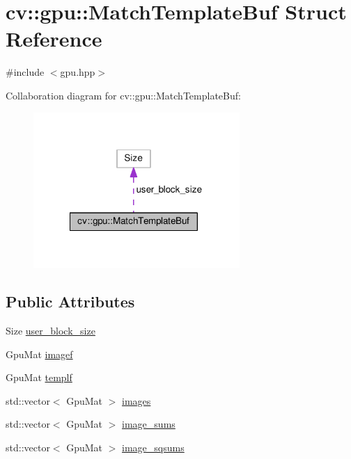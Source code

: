 \hypertarget{structcv_1_1gpu_1_1MatchTemplateBuf}{\section{cv\-:\-:gpu\-:\-:Match\-Template\-Buf Struct Reference}
\label{structcv_1_1gpu_1_1MatchTemplateBuf}
}


{\ttfamily \#include $<$gpu.\-hpp$>$}



Collaboration diagram for cv\-:\-:gpu\-:\-:Match\-Template\-Buf\-:\nopagebreak
\begin{figure}[H]
\begin{center}
\leavevmode
\includegraphics[width=222pt]{structcv_1_1gpu_1_1MatchTemplateBuf__coll__graph}
\end{center}
\end{figure}
\subsection*{Public Attributes}
\begin{DoxyCompactItemize}
\item 
Size \hyperlink{structcv_1_1gpu_1_1MatchTemplateBuf_a3224af1c66c84536181d5bcdd9007339}{user\-\_\-block\-\_\-size}
\item 
Gpu\-Mat \hyperlink{structcv_1_1gpu_1_1MatchTemplateBuf_ac4c593fec0659d07bdeb166973ea24e5}{imagef}
\item 
Gpu\-Mat \hyperlink{structcv_1_1gpu_1_1MatchTemplateBuf_ab0a5afc2f6a35edcf453fd77f878d596}{templf}
\item 
std\-::vector$<$ Gpu\-Mat $>$ \hyperlink{structcv_1_1gpu_1_1MatchTemplateBuf_ae12cf962682edaea5914cb3d8a53b7eb}{images}
\item 
std\-::vector$<$ Gpu\-Mat $>$ \hyperlink{structcv_1_1gpu_1_1MatchTemplateBuf_aba37eb8859e38df75ec1632875c00b40}{image\-\_\-sums}
\item 
std\-::vector$<$ Gpu\-Mat $>$ \hyperlink{structcv_1_1gpu_1_1MatchTemplateBuf_a5c5e8f5ed03328f27921ef1b0b361ad7}{image\-\_\-sqsums}
\end{DoxyCompactItemize}


